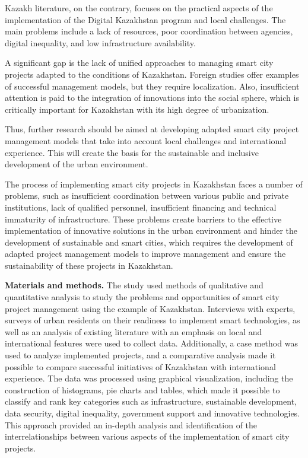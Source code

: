 {Kazakh literature, on the contrary, focuses on the practical aspects of
the implementation of the Digital Kazakhstan program and local
challenges. The main problems include a lack of resources, poor
coordination between agencies, digital inequality, and low
infrastructure availability.

A significant gap is the lack of unified approaches to managing smart
city projects adapted to the conditions of Kazakhstan. Foreign studies
offer examples of successful management models, but they require
localization. Also, insufficient attention is paid to the integration of
innovations into the social sphere, which is critically important for
Kazakhstan with its high degree of urbanization.

Thus, further research should be aimed at developing adapted smart city
project management models that take into account local challenges and
international experience. This will create the basis for the sustainable
and inclusive development of the urban environment.

The process of implementing smart city projects in Kazakhstan faces a
number of problems, such as insufficient coordination between various
public and private institutions, lack of qualified personnel,
insufficient financing and technical immaturity of infrastructure. These
problems create barriers to the effective implementation of innovative
solutions in the urban environment and hinder the development of
sustainable and smart cities, which requires the development of adapted
project management models to improve management and ensure the
sustainability of these projects in Kazakhstan.

{\bfseries Materials and methods.} The study used methods of qualitative
and quantitative analysis to study the problems and opportunities of
smart city project management using the example of Kazakhstan.
Interviews with experts, surveys of urban residents on their readiness
to implement smart technologies, as well as an analysis of existing
literature with an emphasis on local and international features were
used to collect data. Additionally, a case method was used to analyze
implemented projects, and a comparative analysis made it possible to
compare successful initiatives of Kazakhstan with international
experience. The data was processed using graphical visualization,
including the construction of histograms, pie charts and tables, which
made it possible to classify and rank key categories such as
infrastructure, sustainable development, data security, digital
inequality, government support and innovative technologies. This
approach provided an in-depth analysis and identification of the
interrelationships between various aspects of the implementation of
smart city projects.

}
